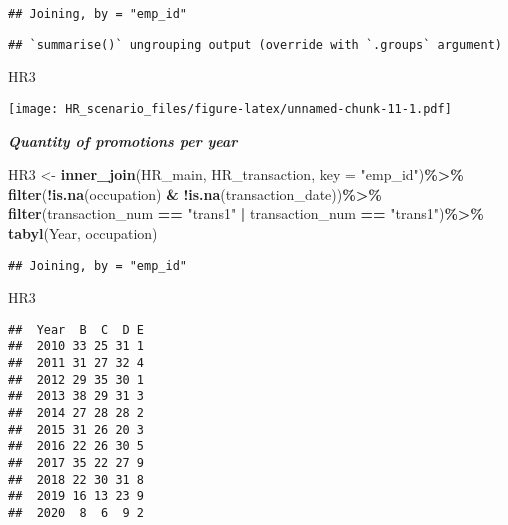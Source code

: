 \documentclass[
]{article}
\newenvironment{Shaded}{\begin{snugshade}}{\end{snugshade}}
\newcommand{\DataTypeTok}[1]{\textcolor[rgb]{0.13,0.29,0.53}{#1}}
\newcommand{\KeywordTok}[1]{\textcolor[rgb]{0.13,0.29,0.53}{\textbf{#1}}}
\newcommand{\NormalTok}[1]{#1}
\newcommand{\OperatorTok}[1]{\textcolor[rgb]{0.81,0.36,0.00}{\textbf{#1}}}
\newcommand{\StringTok}[1]{\textcolor[rgb]{0.31,0.60,0.02}{#1}}
\begin{document}
\begin{verbatim}
## Joining, by = "emp_id"
\end{verbatim}

\begin{verbatim}
## `summarise()` ungrouping output (override with `.groups` argument)
\end{verbatim}

\begin{Shaded}
\begin{Highlighting}[]
\NormalTok{HR3}
\end{Highlighting}
\end{Shaded}

\texttt{[image: HR\_scenario\_files/figure-latex/unnamed-chunk-11-1.pdf]}

\textbf{\emph{Quantity of promotions per year}}

\begin{Shaded}
\begin{Highlighting}[]
\NormalTok{HR3 \textless{}{-}}\StringTok{ }\KeywordTok{inner\_join}\NormalTok{(HR\_main, HR\_transaction, }\DataTypeTok{key =} \StringTok{"emp\_id"}\NormalTok{)}\OperatorTok{\%\textgreater{}\%}
\KeywordTok{filter}\NormalTok{(}\OperatorTok{!}\KeywordTok{is.na}\NormalTok{(occupation) }\OperatorTok{\&}\StringTok{ }\OperatorTok{!}\KeywordTok{is.na}\NormalTok{(transaction\_date))}\OperatorTok{\%\textgreater{}\%}
\KeywordTok{filter}\NormalTok{(transaction\_num }\OperatorTok{==}\StringTok{ "trans1"} \OperatorTok{|}\StringTok{ }\NormalTok{transaction\_num }\OperatorTok{==}\StringTok{ "trans1"}\NormalTok{)}\OperatorTok{\%\textgreater{}\%}
\StringTok{  }\KeywordTok{tabyl}\NormalTok{(Year, occupation)}
\end{Highlighting}
\end{Shaded}

\begin{verbatim}
## Joining, by = "emp_id"
\end{verbatim}

\begin{Shaded}
\begin{Highlighting}[]
\NormalTok{HR3}
\end{Highlighting}
\end{Shaded}

\begin{verbatim}
##  Year  B  C  D E
##  2010 33 25 31 1
##  2011 31 27 32 4
##  2012 29 35 30 1
##  2013 38 29 31 3
##  2014 27 28 28 2
##  2015 31 26 20 3
##  2016 22 26 30 5
##  2017 35 22 27 9
##  2018 22 30 31 8
##  2019 16 13 23 9
##  2020  8  6  9 2
\end{verbatim}
\end{document}
